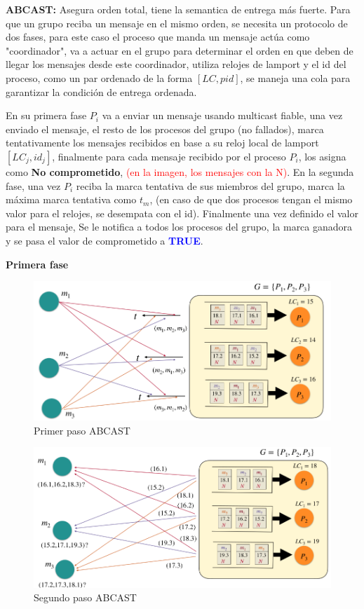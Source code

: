 \textbf{ABCAST:} Asegura orden total, tiene la semantica de entrega más fuerte. Para que un grupo reciba un mensaje en el mismo orden, se necesita un protocolo de dos fases, para este caso el proceso que manda un mensaje actúa como "coordinador", va a actuar en el grupo para determinar el orden en que deben de llegar los mensajes desde este coordinador, utiliza relojes de lamport y el id del proceso, como un par ordenado de la forma $\left[LC, \textit{pid}\right]$, se maneja una cola para garantizar la condición de entrega ordenada.

En su primera fase $P_i$ va a enviar un mensaje usando multicast fiable, una vez enviado el mensaje, el resto de los procesos del grupo (no fallados), marca tentativamente los mensajes recibidos en base a su reloj local de lamport $\left[LC_j, id_j\right]$, finalmente para cada mensaje recibido por el proceso $P_i$, los asigna como \textbf{No comprometido}, \textcolor{red}{(en la imagen, los mensajes con la N)}. En la segunda fase, una vez $P_i$ reciba la marca tentativa de sus miembros del grupo, marca la máxima marca tentativa como $t_m$, (en caso de que dos procesos tengan el mismo valor para el relojes, se desempata con el id). Finalmente una vez definido el valor para el mensaje, Se le notifica a todos los procesos del grupo, la marca ganadora y se pasa el valor de comprometido a \textcolor{blue}{\textbf{TRUE}}.

\textbf{Primera fase}
\begin{figure}[H]
    \centering
    \includegraphics[width=0.7\linewidth]{img/Primer_paso.png}
    \caption{Primer paso ABCAST}\label{fig:1761653095435}
\end{figure}

\begin{figure}[H]
    \centering
    \includegraphics[width=0.7\linewidth]{img/Segundo_paso.png}
    \caption{Segundo paso ABCAST}\label{fig:1761653127112}
\end{figure}

